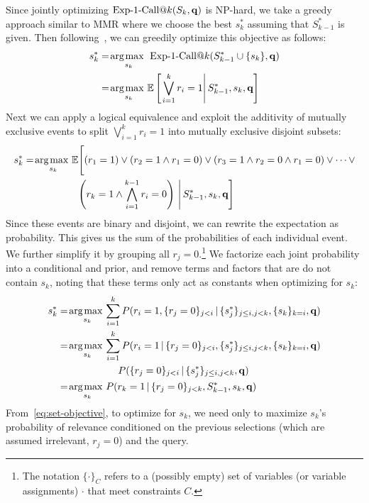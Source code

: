 Since jointly optimizing $\ExpOneCall(S_k,\vec{q})$ is NP-hard, we
take a greedy approach similar to MMR where we choose the best $s_k^*$
assuming that $S_{k-1}^*$ is given.  Then following~\cite{chen06Less},
we can greedily optimize this objective as 
follows:
\begin{align}
s_k^* & = \argmax_{s_k} \; \ExpOneCall(S_{k-1}^* \cup \{ s_k \},\vec{q}) \nonumber \\
   & = \argmax_{s_k} \mathbb{E}\left[\left. \bigvee_{i=1}^{k} r_i=1 \right| S_{k-1}^*, s_{k},\vec{q}\right] \nonumber
\end{align}
Next we can apply a logical equivalence and exploit the additivity of
mutually exclusive events to split $\bigvee_{i=1}^{k} r_i=1$ into mutually exclusive
disjoint subsets:
\begin{align}
s_k^* & = \argmax_{s_k} \mathbb{E}\Bigg[  (r_1=1) \vee (r_2 =1 \wedge r_1=0) \vee (r_3 =1 \wedge r_2=0 \wedge r_1=0) \vee \cdots \vee \nonumber \\
   & \hspace{19mm} \left(r_k=1 \wedge \bigwedge_{i=1}^{k-1} r_i=0 \right) \, \Bigg| \, S_{k-1}^*,s_k,\vec{q} \Bigg] \label{eq:logicalsplit}
\end{align}
Since these events are binary and disjoint, we can rewrite the expectation as probability.
This gives us the sum of the probabilities of each individual event.
We further simplify it by grouping all $r_j = 0$.\footnote{The notation 
$\{ \cdot \}_C$ refers to a (possibly empty) set of 
variables (or variable assignments) $\cdot$ that meet constraints $C$.}
We factorize each joint probability into a conditional and prior, and remove terms and factors that are do not contain $s_k$, noting that these terms only act as constants when optimizing for $s_k$:
\begin{align}   
s_k^* & = \argmax_{s_k} \sum_{i=1}^{k} P(  r_i=1, \{ r_{j}=0 \}_{j<i} \, | \, \{ s^*_j \}_{j\leq i,j<k},\{ s_{k} \}_{k=i},\vec{q}) \nonumber \\
   &= \argmax_{s_k} \sum_{i=1}^{k} P(  r_i=1 \, | \, \{ r_{j}=0 \}_{j<i} , \{ s^*_j \}_{j\leq i,j<k},\{ s_k \}_{k=i},\vec{q}) \nonumber\\
   & \hspace{21.5mm} P(\{ r_{j}=0 \}_{j<i} \, | \, \{ s^*_j \}_{j\leq i,j<k}, \vec{q}) \nonumber \\
   &= \argmax_{s_k} P( r_k=1 \, | \, \{ r_{j}=0 \}_{j<k}, S_{k-1}^*,s_k,\vec{q}) \label{eq:set-objective}
\end{align}
From~\eqref{eq:set-objective}, to optimize for $s_k$, we need only to maximize $s_k$'s probability of relevance conditioned on the previous selections (which are assumed irrelevant, $r_j=0$) and the query.

